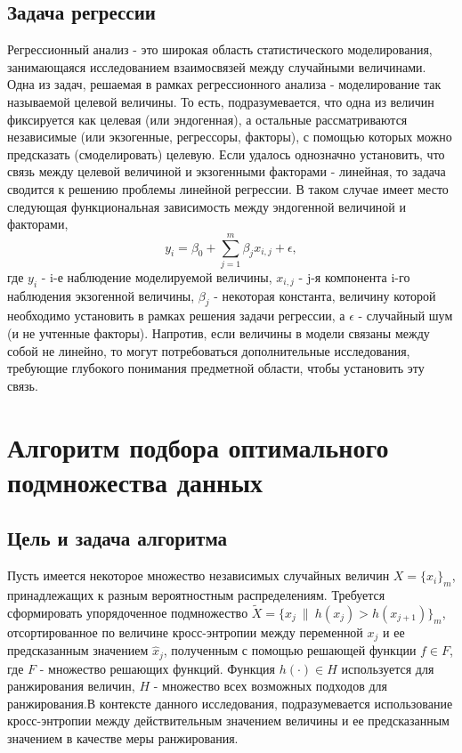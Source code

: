\documentclass[runningheads]{llncs}
\begin{document}
\subsection{Задача регрессии}
Регрессионный анализ - это широкая область статистического моделирования, занимающаяся исследованием взаимосвязей между случайными величинами. Одна из задач, решаемая в рамках регрессионного анализа - моделирование так называемой целевой величины. То есть, подразумевается, что одна из величин фиксируется как целевая (или эндогенная), а остальные рассматриваются независимые (или экзогенные, регрессоры, факторы), с помощью которых можно предсказать (смоделировать) целевую. Если удалось однозначно установить, что связь между целевой величиной и экзогенными факторами - линейная, то задача сводится к решению проблемы линейной регрессии. В таком случае имеет место следующая функциональная зависимость между эндогенной величиной и факторами,
$$y_i = \beta_0 + \sum_{j=1}^m \beta_j x_{i, j} + \epsilon,$$
где $y_i$ - i-е наблюдение моделируемой величины, $x_{i, j}$ - j-я компонента i-го наблюдения экзогенной величины, $\beta_j$ - некоторая константа, величину которой необходимо установить в рамках решения задачи регрессии, а $\epsilon$ - случайный шум (и не учтенные факторы). Напротив, если величины в модели связаны между собой не линейно, то могут потребоваться дополнительные исследования, требующие глубокого понимания предметной области, чтобы установить эту связь.

\section*{Алгоритм подбора оптимального подмножества данных}
\hspace{0.4cm}
\subsection{Цель и задача алгоритма}
Пусть имеется некоторое множество независимых случайных величин $X = \{x_i\}_m$, принадлежащих к разным вероятностным распределениям. Требуется сформировать упорядоченное подмножество $\tilde{X} = \{x_j\ \|\ h(x_{j}) > h(x_{j+1})\}_m$, отсортированное по величине кросс-энтропии между переменной $x_j$ и ее предсказанным значением $\hat{x}_j$, полученным с помощью решающей функции $f \in F$, где $F$ - множество решающих функций. Функция $h(\cdot) \in H$ используется для ранжирования величин, $H$ - множество всех возможных подходов для ранжирования.В контексте данного исследования, подразумевается использование кросс-энтропии между действительным значением величины и ее предсказанным значением в качестве меры ранжирования.
\end{document}
